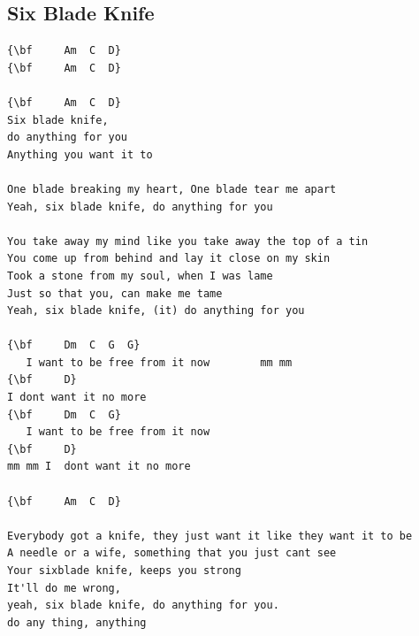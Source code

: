 \documentclass[a4paper]{article}
\begin{document}
\subsection{Six Blade Knife}
\begin{Verbatim}[commandchars=\\\{\}]
{\bf     Am  C  D}
{\bf     Am  C  D}

{\bf     Am  C  D}
Six blade knife,   
do anything for you   
Anything you want it to

One blade breaking my heart, One blade tear me apart
Yeah, six blade knife, do anything for you

You take away my mind like you take away the top of a tin
You come up from behind and lay it close on my skin
Took a stone from my soul, when I was lame
Just so that you, can make me tame
Yeah, six blade knife, (it) do anything for you

{\bf     Dm  C  G  G}
   I want to be free from it now        mm mm
{\bf     D}
I dont want it no more
{\bf     Dm  C  G}
   I want to be free from it now   
{\bf     D}
mm mm I  dont want it no more

{\bf     Am  C  D}

Everybody got a knife, they just want it like they want it to be
A needle or a wife, something that you just cant see
Your sixblade knife, keeps you strong
It'll do me wrong,
yeah, six blade knife, do anything for you.
do any thing, anything

\end{Verbatim}
\newpage
\end{document}
